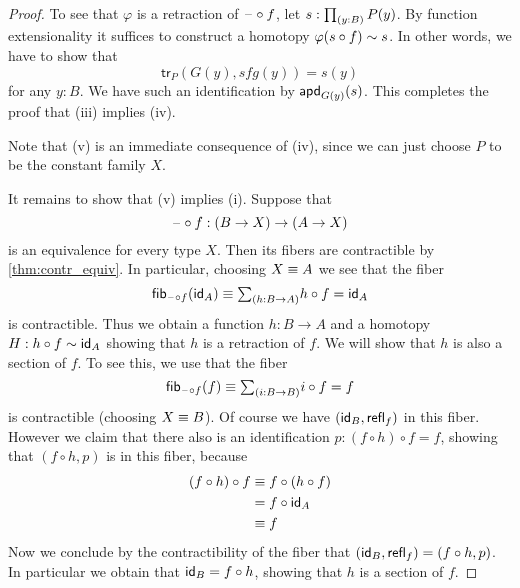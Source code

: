 \begin{proof}
To see that $\varphi$ is a retraction of $\blank\circ f$, let $s:\prd{y:B}P(y)$. By function extensionality it suffices to construct a homotopy $\varphi(s\circ f)\htpy s$. In other words, we have to show that
\begin{equation*}
\mathsf{tr}_P(G(y),sfg(y))=s(y)
\end{equation*}
for any $y:B$. We have such an identification by $\apd{G(y)}{s}$. This completes the proof that (iii) implies (iv).

Note that (v) is an immediate consequence of (iv), since we can just choose $P$ to be the constant family $X$.

It remains to show that (v) implies (i). Suppose that
\begin{equation*}
\blank\circ f:(B\to X)\to (A\to X)
\end{equation*}
is an equivalence for every type $X$. Then its fibers are contractible by \cref{thm:contr_equiv}. In particular, choosing $X\jdeq A$ we see that the fiber
\begin{equation*}
\fib{\blank\circ f}{\idfunc[A]}\jdeq \sm{h:B\to A}h\circ f=\idfunc[A]
\end{equation*}
is contractible. Thus we obtain a function $h:B\to A$ and a homotopy $H:h\circ f\htpy\idfunc[A]$ showing that $h$ is a retraction of $f$. We will show that $h$ is also a section of $f$. To see this, we use that the fiber
\begin{equation*}
\fib{\blank\circ f}{f}\jdeq \sm{i:B\to B} i\circ f=f
\end{equation*}
is contractible (choosing $X\jdeq B$). 
Of course we have $(\idfunc[B],\refl{f})$ in this fiber. However we claim that there also is an identification $p:(f\circ h)\circ f=f$, showing that $(f\circ h,p)$ is in this fiber, because
\begin{align*}
(f\circ h)\circ f & \jdeq f\circ (h\circ f) \\
& = f\circ \idfunc[A] \\
& \jdeq f
\end{align*}
Now we conclude by the contractibility of the fiber that $(\idfunc[B],\refl{f})=(f\circ h,p)$. In particular we obtain that $\idfunc[B]=f\circ h$, showing that $h$ is a section of $f$.
\end{proof}

